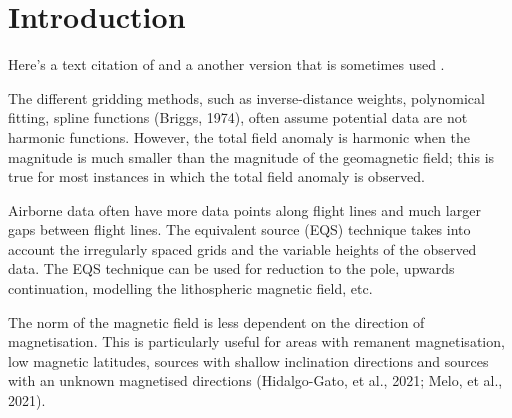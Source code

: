 
\section{Introduction}

Here's a text citation of \citet{OliveiraJr2015}
and a another version that is sometimes used \citep{OliveiraJr2015}.

The different gridding methods, such as inverse-distance weights, polynomical fitting, spline functions (Briggs, 1974), often assume potential data are not harmonic functions. However, the total field anomaly is harmonic when the magnitude is much smaller than the magnitude of the geomagnetic field; this is true for most instances in which the total field anomaly is observed. 

Airborne data often have more data points along flight lines and much larger gaps between flight lines. The equivalent source (EQS) technique takes into account the irregularly spaced grids and the variable heights of the observed data. The EQS technique can be used for reduction to the pole, upwards continuation, modelling the lithospheric magnetic field, etc.

The norm of the magnetic field is less dependent on the direction of magnetisation. This is particularly useful for areas with remanent magnetisation, low magnetic latitudes, sources with shallow inclination directions and sources with an unknown magnetised directions (Hidalgo-Gato, et al., 2021; Melo, et al., 2021).


